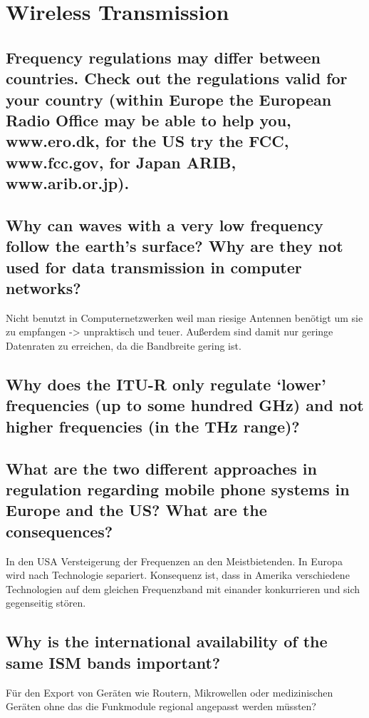 \section{Wireless Transmission}

\subsection{Frequency regulations may differ between countries. Check out the regulations valid
for your country (within Europe the European Radio Office may be able to help you,
www.ero.dk, for the US try the FCC, www.fcc.gov, for Japan ARIB, www.arib.or.jp).}

\subsection{Why can waves with a very low frequency follow the earth’s surface? Why are they
not used for data transmission in computer networks?}
Nicht benutzt in Computernetzwerken weil man riesige Antennen benötigt um sie zu empfangen -> unpraktisch und teuer. Außerdem sind damit nur geringe Datenraten zu erreichen, da die Bandbreite gering ist.

\subsection{Why does the ITU-R only regulate ‘lower’ frequencies (up to some hundred GHz) and
not higher frequencies (in the THz range)?}

\subsection{What are the two different approaches in regulation regarding mobile phone systems
in Europe and the US? What are the consequences?}
In den USA Versteigerung der Frequenzen an den Meistbietenden. In Europa wird nach Technologie separiert. Konsequenz ist, dass in Amerika verschiedene Technologien auf dem gleichen Frequenzband mit einander konkurrieren und sich gegenseitig stören.

\subsection{Why is the international availability of the same ISM bands important?}
Für den Export von Geräten wie Routern, Mikrowellen oder medizinischen Geräten ohne das die Funkmodule regional angepasst werden müssten? 

